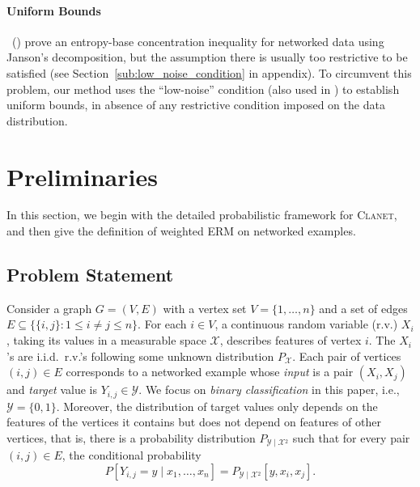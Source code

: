 \documentclass[letterpaper]{article} %
\newcommand{\xspace}{\mathcal{X}}
\newcommand{\yspace}{\mathcal{Y}}
\newcommand{\edge}[1]{\{#1\}}
\newcommand{\pair}[1]{(#1)}
\newcommand{\problemabbr}{\textnormal{C}\textsc{lanet}}
\newcommand{\red}[1]{\textcolor{red}{#1}}
\newcommand{\todo}[1]{\red{\textsc{todo:} #1}}
\newcommand{\citet}[1]{\citeauthor{#1}\ (\citeyear{#1})}
\begin{document}
\paragraph{Uniform Bounds} 
\citet{DBLP:conf/icml/RalaivolaA15} prove an entropy-base concentration inequality for networked data using Janson's decomposition, but the 
assumption there is usually too restrictive to be satisfied %
(see Section~\ref{sub:low_noise_condition} in appendix). 
To circumvent this problem, our method uses 
the ``low-noise'' condition (also used in \cite{papa2016graph}) to establish uniform bounds, 
in absence of any restrictive condition imposed on the data distribution. 

\section{Preliminaries} %
\label{sec:preliminaries}

In this section, we begin with the detailed probabilistic framework for \problemabbr{}, and then give the definition of weighted ERM on networked examples. 

\subsection{Problem Statement} %
\label{sub:problem_statement}

Consider a graph $G=(V,E)$ with a vertex set $V=\{1,\dots,n\}$ and a set of edges $E\subseteq\{\edge{i,j}: 1\le i\neq j\le n\}$. 
For each $i\in V$, a continuous random variable (r.v.) $X_i$, taking its values in a measurable space $\xspace{}$, describes features of vertex $i$. The $X_i$'s are i.i.d.\ r.v.'s following some unknown distribution $P_\xspace$.
Each pair of vertices $\pair{i,j}\in E$ corresponds to a networked example whose \emph{input} is a pair $(X_i,X_j)$ and \emph{target} value is $Y_{i,j}\in\yspace{}.$ 
We focus on \emph{binary classification} in this paper, i.e., $\yspace{} = \{0,1\}$. 
Moreover, the distribution of target values only depends on the features of the vertices it contains but does not depend on features of other vertices, that is, there is a probability distribution $P_{\yspace{}\mid\xspace{}^2}$ such that for every pair $\pair{i,j}\in E$, the conditional probability 
\[P\left[Y_{i,j}=y\mid x_1,\ldots,x_n\right]=P_{\yspace{}\mid\xspace{}^2}\left[y,x_i,x_j\right].\]  
\end{document}
